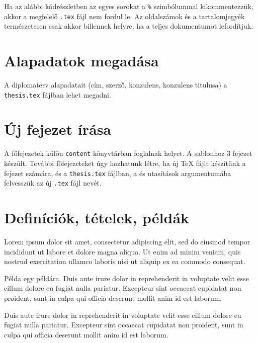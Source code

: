 Ha az alábbi kódrészletben az egyes sorokat a \verb+%+ szimbólummal kikommentezzük, akkor a megfelelő \verb+.tex+ fájl nem fordul le. Az oldalszámok és a tartalomjegyék természetesen csak akkor billennek helyre, ha a teljes dokumentumot lefordítjuk.

\newpage
\section{Alapadatok megadása}
A diplomaterv alapadatait (cím, szerző, konzulens, konzulens titulusa) a \verb+thesis.tex+ fájlban lehet megadni.

\section{Új fejezet írása}
A főfejezetek külön \verb+content+ könyvtárban foglalnak helyet. A sablonhoz 3 fejezet készült. További főfejezeteket úgy hozhatunk létre, ha új TeX fájlt készítünk a fejezet számára, és a \verb+thesis.tex+ fájlban, a \verb++ és \verb++ utasítások argumentumába felvesszük az új \verb+.tex+ fájl nevét.


\section{Definíciók, tételek, példák}

\begin{definition}
Lorem ipsum dolor sit amet, consectetur adipiscing elit, sed do eiusmod tempor incididunt ut labore et dolore magna aliqua. Ut enim ad minim veniam, quis nostrud exercitation ullamco laboris nisi ut aliquip ex ea commodo consequat.
\end{definition}

\begin{example}
Példa egy példára. Duis aute irure dolor in reprehenderit in voluptate velit esse cillum dolore eu fugiat nulla pariatur. Excepteur sint occaecat cupidatat non proident, sunt in culpa qui officia deserunt mollit anim id est laborum.
\end{example}

\begin{theorem}
Duis aute irure dolor in reprehenderit in voluptate velit esse cillum dolore eu fugiat nulla pariatur. Excepteur sint occaecat cupidatat non proident, sunt in culpa qui officia deserunt mollit anim id est laborum.
\end{theorem}
